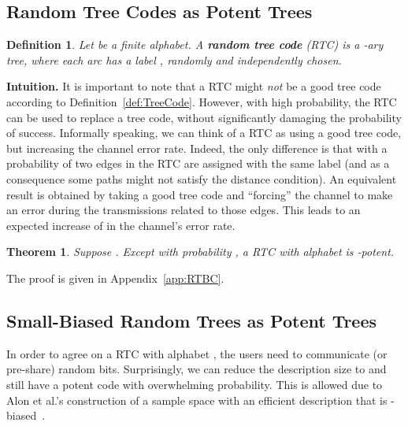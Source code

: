 \documentclass[ letterpaper, 11pt]{article}
\newtheorem{theorem}{Theorem}[section]
\newtheorem{definition}{Definition}
\newcommand{\potent}{potent\xspace}
\newcommand{\RTBC}{\textsf{RTC}\xspace}
\begin{document}
\subsection{Random Tree Codes as Potent Trees}


\begin{definition}
Let  be a finite alphabet.
A {\bf random tree code} (\RTBC) is a -ary tree,
where each arc  has a label ,
randomly and independently chosen.
\end{definition}

\noindent
\textbf{Intuition.}
It is important to note that a \RTBC might {\em not} be a good tree code
according to Definition~\ref{def:TreeCode}.
However, with high probability, the \RTBC can be used to replace a tree code, without significantly
damaging the probability of success.
Informally speaking, we can think of a \RTBC as using a good tree code, but increasing
the channel error rate. Indeed, the only difference is that with a probability of
 two edges in the \RTBC are assigned with the same label
(and as a consequence some paths might not satisfy the distance condition).
An equivalent result is obtained by taking a good tree code and ``forcing'' the channel
to make an error during the transmissions related to those edges.
This leads to an expected increase of  in the channel's error rate.



\begin{theorem}\label{thm:RTCisPotent}
Suppose .
Except with probability ,
a \RTBC with alphabet 
is -\potent.
\end{theorem}
\noindent The proof is given in Appendix~\ref{app:RTBC}.
\bigskip



\subsection{Small-Biased Random Trees as Potent Trees}


In order to agree on a \RTBC with alphabet , the users need to communicate
(or pre-share)  random bits. Surprisingly, we can reduce the description size to
 and still have a \potent code with overwhelming probability.
This is allowed due to Alon et al.'s construction of  a sample space with an efficient description
that is -biased~\cite{AGHP92}.
\end{document}
